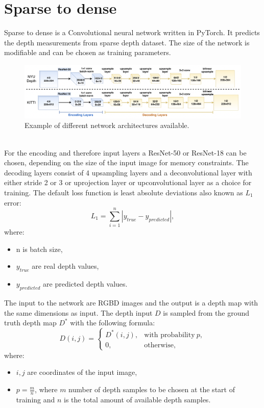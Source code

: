 \documentclass[twoside]{ctuthesis}
\theoremstyle{plain}
\theoremstyle{definition}
\theoremstyle{note}
\begin{document}
\section{Sparse to dense}
Sparse to dense is a Convolutional neural network written in PyTorch. It predicts the depth measurements from sparse depth dataset. The size of the network is modifiable and can be chosen as training parameters.
\begin{figure}[h!]
	\caption{Example of different network architectures available.}
	\includegraphics[width=\textwidth]{sparse2dense.png}
	\centering
\end{figure}\\
For the encoding and therefore input layers a ResNet-50 or ResNet-18 can be chosen, depending on the size of the input image for memory constraints. The decoding layers consist of 4 upsampling layers and a deconvolutional layer with either stride 2 or 3 or uprojection layer or upconvolutional layer as a choice for training. The default loss function is least absolute deviations also known as $L_1$ error:
\begin{equation}
	L_1=\sum_{i=1}^{n}|y_{true}-y_{predicted}|,
\end{equation}
where:
\begin{itemize}
	\item n is batch size,
	\item $y_{true}$ are real depth values,
	\item $y_{predicted}$ are predicted depth values.
\end{itemize}
The input to the network are RGBD images and the output is a depth map with the same dimensions as input. The depth input $D$ is sampled from the ground truth depth map $D^*$ with the following formula:
\begin{equation}
	D(i,j)=\begin{cases}
		D^*(i,j),&\text{with probability}\ p,\\
		0,&\text{otherwise},
	\end{cases}
\end{equation}
where:
\begin{itemize}
	\item $i,j$ are coordinates of the input image,
	\item $p=\frac{m}{n}$, where $m$ number of depth samples to be chosen at the start of training and $n$ is the total amount of available depth samples.
\end{itemize}
\end{document}
